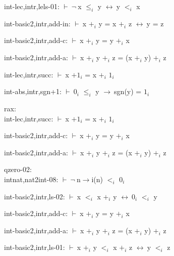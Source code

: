 \documentclass[a4paper]{article}
\newcommand{\Fol}{\mbox{$\vdash\ $}}
\newcommand{\Not}{\mbox{$\neg\ $}}
\newcommand{\Imp}{\mbox{$\rightarrow\ $}}
\newcommand{\Equiv}{\mbox{$\leftrightarrow\ $}}
\begin{document}
int-lec,intr,lels-01: 
 \Fol \Not x $\mbox{$\le$}_{i}$ y \Equiv y $\mbox{$<$}_{i}$ x



int-basic2,intr,add-in: 
 \Fol x $\mbox{+}_{i}$ y = x $\mbox{+}_{i}$ z \Equiv y = z



int-basic2,intr,add-c: 
 \Fol x $\mbox{+}_{i}$ y = y $\mbox{+}_{i}$ x



int-basic2,intr,add-a: 
 \Fol x $\mbox{+}_{i}$ y $\mbox{+}_{i}$ z = (x $\mbox{+}_{i}$ y) $\mbox{+}_{i}$ z



int-lec,intr,succ: 
 \Fol x $\mbox{+1}_{i}$ = x $\mbox{+}_{i}$ $\mbox{1}_{i}$



int-abs,intr,sgn+1: 
 \Fol $\mbox{0}_{i}$ $\mbox{$\le$}_{i}$ y \Imp sgn(y) = $\mbox{1}_{i}$



\bigskip

rax:\\ int-lec,intr,succ: 
 \Fol x $\mbox{+1}_{i}$ = x $\mbox{+}_{i}$ $\mbox{1}_{i}$



int-basic2,intr,add-c: 
 \Fol x $\mbox{+}_{i}$ y = y $\mbox{+}_{i}$ x



int-basic2,intr,add-a: 
 \Fol x $\mbox{+}_{i}$ y $\mbox{+}_{i}$ z = (x $\mbox{+}_{i}$ y) $\mbox{+}_{i}$ z



\bigskip

qzero-02:\\ intnat,nat2int-08: 
 \Fol \Not n$\to$i(n) $\mbox{$<$}_{i}$ $\mbox{0}_{i}$



int-basic2,intr,ls-02: 
 \Fol x $\mbox{$<$}_{i}$ x $\mbox{+}_{i}$ y \Equiv $\mbox{0}_{i}$ $\mbox{$<$}_{i}$ y



int-basic2,intr,add-c: 
 \Fol x $\mbox{+}_{i}$ y = y $\mbox{+}_{i}$ x



int-basic2,intr,add-a: 
 \Fol x $\mbox{+}_{i}$ y $\mbox{+}_{i}$ z = (x $\mbox{+}_{i}$ y) $\mbox{+}_{i}$ z



int-basic2,intr,ls-01: 
 \Fol x $\mbox{+}_{i}$ y $\mbox{$<$}_{i}$ x $\mbox{+}_{i}$ z \Equiv y $\mbox{$<$}_{i}$ z
\end{document}
